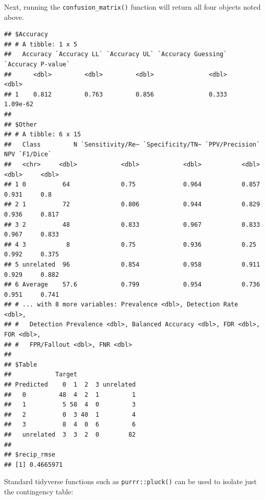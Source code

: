 \documentclass[9pt,a4paper,]{extarticle}
\newenvironment{Shaded}{\begin{snugshade}}{\end{snugshade}}
\newcommand{\AttributeTok}[1]{\textcolor[rgb]{0.77,0.63,0.00}{#1}}
\newcommand{\FunctionTok}[1]{\textcolor[rgb]{0.00,0.00,0.00}{#1}}
\newcommand{\NormalTok}[1]{#1}
\newcommand{\SpecialCharTok}[1]{\textcolor[rgb]{0.00,0.00,0.00}{#1}}
\newcommand{\StringTok}[1]{\textcolor[rgb]{0.31,0.60,0.02}{#1}}
\begin{document}
Next, running the \texttt{confusion\_matrix()} function will return all four objects noted above.

\begin{Shaded}
\end{Shaded}

\begin{verbatim}
## $Accuracy
## # A tibble: 1 x 5
##   Accuracy `Accuracy LL` `Accuracy UL` `Accuracy Guessing` `Accuracy P-value`
##      <dbl>         <dbl>         <dbl>               <dbl>              <dbl>
## 1    0.812         0.763         0.856               0.333           1.09e-62
## 
## $Other
## # A tibble: 6 x 15
##   Class         N `Sensitivity/Re~ `Specificity/TN~ `PPV/Precision`   NPV `F1/Dice`
##   <chr>     <dbl>            <dbl>            <dbl>           <dbl> <dbl>     <dbl>
## 1 0          64              0.75             0.964           0.857 0.931     0.8  
## 2 1          72              0.806            0.944           0.829 0.936     0.817
## 3 2          48              0.833            0.967           0.833 0.967     0.833
## 4 3           8              0.75             0.936           0.25  0.992     0.375
## 5 unrelated  96              0.854            0.958           0.911 0.929     0.882
## 6 Average    57.6            0.799            0.954           0.736 0.951     0.741
## # ... with 8 more variables: Prevalence <dbl>, Detection Rate <dbl>,
## #   Detection Prevalence <dbl>, Balanced Accuracy <dbl>, FDR <dbl>, FOR <dbl>,
## #   FPR/Fallout <dbl>, FNR <dbl>
## 
## $Table
##            Target
## Predicted    0  1  2  3 unrelated
##   0         48  4  2  1         1
##   1          5 58  4  0         3
##   2          0  3 40  1         4
##   3          8  4  0  6         6
##   unrelated  3  3  2  0        82
## 
## $recip_rmse
## [1] 0.4665971
\end{verbatim}

Standard tidyverse functions such as \texttt{purrr::pluck()} can be used to isolate just the contingency table:

\begin{Shaded}
\end{Shaded}
\end{document}
